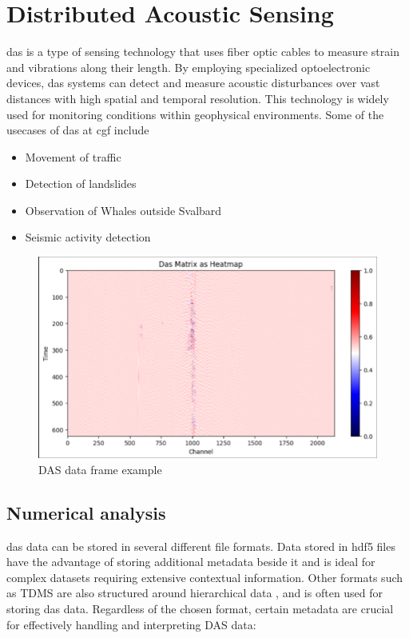 \section{Distributed Acoustic Sensing}
\label{back:das}

\acrfull{das} is a type of sensing technology that uses fiber optic cables to measure strain and vibrations along their length. By employing specialized optoelectronic devices, \acrshort{das} systems can detect and measure acoustic disturbances over vast distances with high spatial and temporal resolution. This technology is widely used for monitoring conditions within geophysical environments. Some of the usecases of \acrshort{das} at \acrshort{cgf} include

\begin{itemize}
    \item Movement of traffic
    \item Detection of landslides
    \item Observation of Whales outside Svalbard
    \item Seismic activity detection
\end{itemize}


\begin{figure}[!h]
    \centering
    \includegraphics[width=0.7\linewidth]{figures/das_example.png}
    \caption{DAS data frame example}
    \label{fig:dasframe-ex}
\end{figure}

\subsection{Numerical analysis}

\acrshort{das} data can be stored in several different file formats. Data stored in \acrshort{hdf5} files have the advantage of storing additional metadata beside it and is ideal for complex datasets requiring extensive contextual information. Other formats such as TDMS are also structured around hierarchical data \cite{10.1145/800196.805973}, and is often used for storing \acrshort{das} data. Regardless of the chosen format, certain metadata are crucial for effectively handling and interpreting DAS data:

